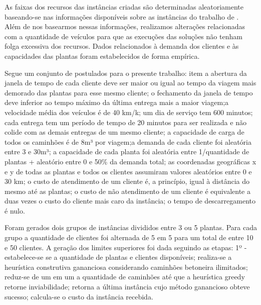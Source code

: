 As faixas dos recursos das instâncias criadas são determinadas aleatoriamente baseando-se nas informações disponíveis sobre as instâncias do trabalho de \cite{cantu}. Além de nos basearmos nessas informações, realizamos alterações relacionadas com a quantidade de veículos para que as execuções das soluções não tenham folga excessiva dos recursos. Dados relacionados à demanda dos clientes e às capacidades das plantas foram estabelecidos de forma empírica.

Segue um conjunto de postulados para o presente trabalho: item a abertura da janela de tempo de cada cliente deve ser maior ou igual ao tempo da viagem mais demorado das plantas para esse mesmo cliente; o fechamento da janela de tempo deve inferior ao tempo máximo da última entrega mais a maior viagem;a velocidade média dos veículos é de 40 km/k; um dia de serviço tem 600 minutos; cada entrega tem um período de tempo de 20 minutos para ser realizada e não colide com as demais entregas de um mesmo cliente; a capacidade de carga de todos os caminhões é de 8m³ por viagem;a demanda de cada cliente foi aleatória entre 3 e 30m³; a capacidade de cada planta foi aleatória entre 1/quantidade de plantas + aleatório entre 0 e 50\% da demanda total; as coordenadas geográficas x e y de todas as plantas e todos os clientes assumiram valores aleatórios entre 0 e 30 km; o custo de atendimento de um cliente é, a princípio, igual à distância do mesmo até as plantas; o custo de não atendimento de um cliente é equivalente a duas vezes o custo do cliente mais caro da instância; o tempo de descarregamento é nulo.


Foram gerados dois grupos de instâncias divididos entre 3 ou 5 plantas. Para cada grupo a quantidade de clientes foi alternada de 5 em 5 para um total de entre 10 e 50 clientes. A geração dos limites superiores foi dada seguindo as etapas: 1º - estabelece-se se a quantidade de plantas e clientes disponíveis; realiza-se a heurística construtiva gananciosa considerando caminhões betoneira ilimitados; reduz-se de um em um a quantidade de caminhões até que a heurística greedy retorne inviabilidade; retorna a última instância cujo método ganancioso obteve sucesso; calcula-se o custo da instância recebida.

